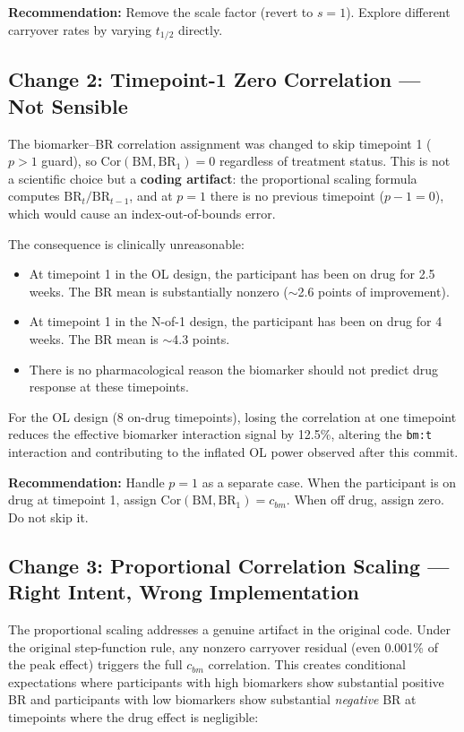 \documentclass[11pt]{article}
\begin{document}
\textbf{Recommendation:} Remove the scale factor (revert to
$s = 1$). Explore different carryover rates by varying
$t_{1/2}$ directly.

\subsection{Change 2: Timepoint-1 Zero Correlation ---
            Not Sensible}

The biomarker--BR correlation assignment was changed to skip
timepoint 1 ($p > 1$ guard), so
$\text{Cor}(\text{BM}, \text{BR}_1) = 0$ regardless of
treatment status. This is not a scientific choice but a
\textbf{coding artifact}: the proportional scaling formula
computes $\text{BR}_t / \text{BR}_{t-1}$, and at $p = 1$
there is no previous timepoint ($p - 1 = 0$), which would
cause an index-out-of-bounds error.

The consequence is clinically unreasonable:

\begin{itemize}
\item At timepoint 1 in the OL design, the participant has
  been on drug for 2.5 weeks. The BR mean is substantially
  nonzero ($\sim$2.6 points of improvement).
\item At timepoint 1 in the N-of-1 design, the participant
  has been on drug for 4 weeks. The BR mean is $\sim$4.3
  points.
\item There is no pharmacological reason the biomarker should
  not predict drug response at these timepoints.
\end{itemize}

For the OL design (8 on-drug timepoints), losing the
correlation at one timepoint reduces the effective
biomarker interaction signal by 12.5\%, altering the
\texttt{bm:t} interaction and contributing to the
inflated OL power observed after this commit.

\textbf{Recommendation:} Handle $p = 1$ as a separate case.
When the participant is on drug at timepoint 1, assign
$\text{Cor}(\text{BM}, \text{BR}_1) = c_{bm}$. When off drug,
assign zero. Do not skip it.

\subsection{Change 3: Proportional Correlation Scaling ---
            Right Intent, Wrong Implementation}

The proportional scaling addresses a genuine artifact in the
original code. Under the original step-function rule, any
nonzero carryover residual (even 0.001\% of the peak effect)
triggers the full $c_{bm}$ correlation. This creates
conditional expectations where participants with high
biomarkers show substantial positive BR and participants with
low biomarkers show substantial \emph{negative} BR at
timepoints where the drug effect is negligible:
\end{document}
